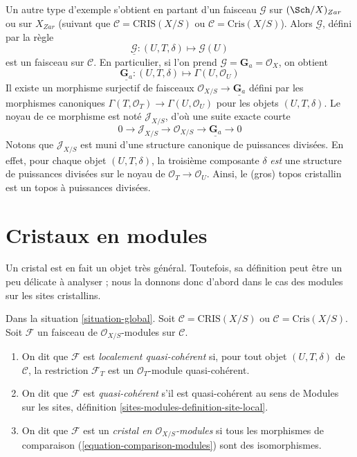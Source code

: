 \medskip\noindent
Un autre type d'exemple s'obtient en partant d'un faisceau
$\mathcal{G}$ sur $(\Sch/X)_{Zar}$ ou sur $X_{Zar}$ (suivant que
$\mathcal{C} = \text{CRIS}(X/S)$ ou $\mathcal{C} = \text{Cris}(X/S)$).
Alors $\underline{\mathcal{G}}$, défini par la règle
$$
\underline{\mathcal{G}} :
(U, T, \delta)
\longmapsto
\mathcal{G}(U)
$$
est un faisceau sur $\mathcal{C}$. En particulier, si l'on prend
$\mathcal{G} = \mathbf{G}_a = \mathcal{O}_X$, on obtient
$$
\underline{\mathbf{G}_a} :
(U, T, \delta)
\longmapsto
\Gamma(U, \mathcal{O}_U)
$$
Il existe un morphisme surjectif de faisceaux
$\mathcal{O}_{X/S} \to \underline{\mathbf{G}_a}$ défini par les
morphismes canoniques $\Gamma(T, \mathcal{O}_T) \to \Gamma(U, \mathcal{O}_U)$
pour les objets $(U, T, \delta)$. Le noyau de ce morphisme est noté
$\mathcal{J}_{X/S}$, d'où une suite exacte courte
$$
0 \to
\mathcal{J}_{X/S} \to
\mathcal{O}_{X/S} \to
\underline{\mathbf{G}_a} \to 0
$$
Notons que $\mathcal{J}_{X/S}$ est muni d'une structure canonique de
puissances divisées. En effet, pour chaque objet $(U, T, \delta)$,
la troisième composante $\delta$ {\it est} une structure de puissances divisées sur le
noyau de $\mathcal{O}_T \to \mathcal{O}_U$. Ainsi, le (gros)
topos cristallin est un topos à puissances divisées.





\section{Cristaux en modules}
\label{section-crystals}

\noindent
Un cristal est en fait un objet très général. Toutefois, sa
définition peut être un peu délicate à analyser ; nous la donnons donc d'abord
dans le cas des modules sur les sites cristallins.

\begin{definition}
\label{definition-modules}
Dans la situation \ref{situation-global}.
Soit $\mathcal{C} = \text{CRIS}(X/S)$ ou $\mathcal{C} = \text{Cris}(X/S)$.
Soit $\mathcal{F}$ un faisceau de $\mathcal{O}_{X/S}$-modules sur $\mathcal{C}$.
\begin{enumerate}
\item On dit que $\mathcal{F}$ est {\it localement quasi-cohérent} si, pour tout
objet $(U, T, \delta)$ de $\mathcal{C}$, la restriction $\mathcal{F}_T$
est un $\mathcal{O}_T$-module quasi-cohérent.
\item On dit que $\mathcal{F}$ est {\it quasi-cohérent} s'il est quasi-cohérent
au sens de
Modules sur les sites, définition \ref{sites-modules-definition-site-local}.
\item On dit que $\mathcal{F}$ est un {\it cristal en $\mathcal{O}_{X/S}$-modules}
si tous les morphismes de comparaison (\ref{equation-comparison-modules}) sont des
isomorphismes.
\end{enumerate}
\end{definition}

